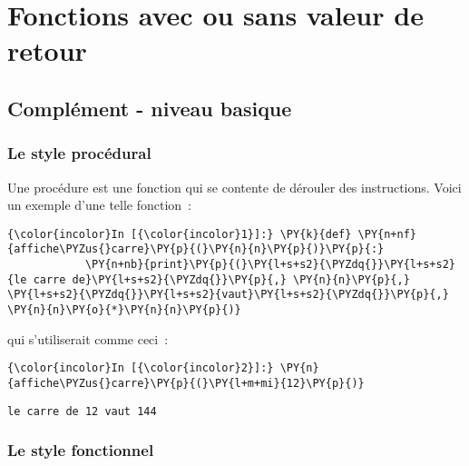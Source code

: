     \hypertarget{fonctions-avec-ou-sans-valeur-de-retour}{%
\section{Fonctions avec ou sans valeur de
retour}\label{fonctions-avec-ou-sans-valeur-de-retour}}

    \hypertarget{compluxe9ment---niveau-basique}{%
\subsection{Complément - niveau
basique}\label{compluxe9ment---niveau-basique}}

    \hypertarget{le-style-procuxe9dural}{%
\subsubsection{Le style procédural}\label{le-style-procuxe9dural}}

    Une procédure est une fonction qui se contente de dérouler des
instructions. Voici un exemple d'une telle fonction~:

    \begin{Verbatim}[commandchars=\\\{\}]
{\color{incolor}In [{\color{incolor}1}]:} \PY{k}{def} \PY{n+nf}{affiche\PYZus{}carre}\PY{p}{(}\PY{n}{n}\PY{p}{)}\PY{p}{:}
            \PY{n+nb}{print}\PY{p}{(}\PY{l+s+s2}{\PYZdq{}}\PY{l+s+s2}{le carre de}\PY{l+s+s2}{\PYZdq{}}\PY{p}{,} \PY{n}{n}\PY{p}{,} \PY{l+s+s2}{\PYZdq{}}\PY{l+s+s2}{vaut}\PY{l+s+s2}{\PYZdq{}}\PY{p}{,} \PY{n}{n}\PY{o}{*}\PY{n}{n}\PY{p}{)}
\end{Verbatim}


    qui s'utiliserait comme ceci~:

    \begin{Verbatim}[commandchars=\\\{\}]
{\color{incolor}In [{\color{incolor}2}]:} \PY{n}{affiche\PYZus{}carre}\PY{p}{(}\PY{l+m+mi}{12}\PY{p}{)}
\end{Verbatim}


    \begin{Verbatim}[commandchars=\\\{\}]
le carre de 12 vaut 144

    \end{Verbatim}

    \hypertarget{le-style-fonctionnel}{%
\subsubsection{Le style fonctionnel}\label{le-style-fonctionnel}}

